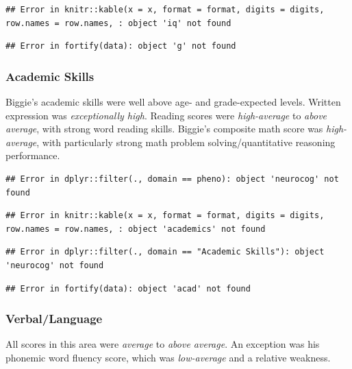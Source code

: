\documentclass[%
numbers=noendperiod,
parskip=half,
bibliography=totoc,
DIV=calc,headsepline=true,
]{scrartcl}
\begin{document}
\begin{verbatim}
## Error in knitr::kable(x = x, format = format, digits = digits, row.names = row.names, : object 'iq' not found
\end{verbatim}

\begin{verbatim}
## Error in fortify(data): object 'g' not found
\end{verbatim}

\newpage

\hypertarget{academic-skills}{%
\subsubsection{Academic Skills}\label{academic-skills}}

Biggie's academic skills were well above age- and grade-expected
levels. Written expression was \emph{exceptionally high}. Reading scores were
\emph{high-average} to \emph{above average}, with strong word reading skills.
Biggie's composite math score was \emph{high-average}, with particularly
strong math problem solving/quantitative reasoning performance.

\begin{verbatim}
## Error in dplyr::filter(., domain == pheno): object 'neurocog' not found
\end{verbatim}

\begin{verbatim}
## Error in knitr::kable(x = x, format = format, digits = digits, row.names = row.names, : object 'academics' not found
\end{verbatim}

\begin{verbatim}
## Error in dplyr::filter(., domain == "Academic Skills"): object 'neurocog' not found
\end{verbatim}

\begin{verbatim}
## Error in fortify(data): object 'acad' not found
\end{verbatim}

\newpage

\hypertarget{verballanguage}{%
\subsubsection{Verbal/Language}\label{verballanguage}}

All scores in this area were \emph{average} to \emph{above average}. An exception was
his phonemic word fluency score, which was \emph{low-average} and a
relative weakness.
\end{document}
